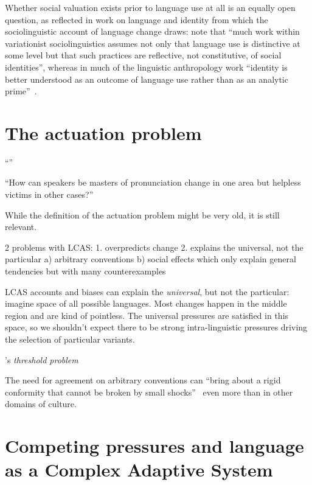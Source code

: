 Whether social valuation exists prior to language use at all is an equally open question, as reflected in work on language and identity from which the sociolinguistic account of language change draws: \citeauthor{Bucholtz2004} note that ``much work within variationist sociolinguistics assumes not only that language use is distinctive at some level but that such practices are reflective, not constitutive, of social identities'', whereas in much of the linguistic anthropology work ``identity is better understood as an outcome of language use rather than as an analytic prime''~\citeyear[p.376]{Bucholtz2004}.

\section{The actuation problem}


``''~\citep[p.?]{Weinreich1968}


``How can speakers be masters of pronunciation change in one area but helpless victims in other cases?''~\citep[p.192]{Ohala1989}


While the definition of the actuation problem might be very old, it is still relevant.

2 problems with LCAS:
1. overpredicts change
2. explains the universal, not the particular
a) arbitrary conventions
b) social effects which only explain general tendencies but with many counterexamples

LCAS accounts and biases can explain the \emph{universal}, but not the particular: imagine space of all possible languages. Most changes happen in the middle region and are kind of pointless. The universal pressures are satisfied in this space, so we shouldn't expect there to be strong intra-linguistic pressures driving the selection of particular variants.

\citet{Nettle1999}'s \emph{threshold problem}

The need for agreement on arbitrary conventions can ``bring about a rigid conformity that cannot be broken by small shocks''~\citep{Bikhchandani1992} even more than in other domains of culture.

\section{Competing pressures and language as a Complex Adaptive System}
\label{sec:competingpressures}

